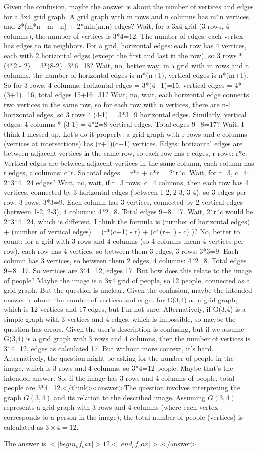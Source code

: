 Given the confusion, maybe the answer is about the number of vertices and edges for a 3x4 grid graph. A grid graph with m rows and n columns has m*n vertices, and 2*(m*n - m - n) + 2*min(m,n) edges? Wait, for a 3x4 grid (3 rows, 4 columns), the number of vertices is 3*4=12. The number of edges: each vertex has edges to its neighbors. For a grid, horizontal edges: each row has 4 vertices, each with 2 horizontal edges (except the first and last in the row), so 3 rows * (4*2 - 2) = 3*(8-2)=3*6=18? Wait, no, better way: in a grid with m rows and n columns, the number of horizontal edges is m*(n+1), vertical edges is n*(m+1). So for 3 rows, 4 columns: horizontal edges = 3*(4+1)=15, vertical edges = 4*(3+1)=16, total edges 15+16=31? Wait, no, wait, each horizontal edge connects two vertices in the same row, so for each row with n vertices, there are n-1 horizontal edges, so 3 rows * (4-1) = 3*3=9 horizontal edges. Similarly, vertical edges: 4 columns * (3-1) = 4*2=8 vertical edges. Total edges 9+8=17? Wait, I think I messed up. Let's do it properly: a grid graph with r rows and c columns (vertices at intersections) has (r+1)(c+1) vertices. Edges: horizontal edges are between adjacent vertices in the same row, so each row has c edges, r rows: r*c. Vertical edges are between adjacent vertices in the same column, each column has r edges, c columns: c*r. So total edges = r*c + c*r = 2*r*c. Wait, for r=3, c=4: 2*3*4=24 edges? Wait, no, wait, if r=3 rows, c=4 columns, then each row has 4 vertices, connected by 3 horizontal edges (between 1-2, 2-3, 3-4), so 3 edges per row, 3 rows: 3*3=9. Each column has 3 vertices, connected by 2 vertical edges (between 1-2, 2-3), 4 columns: 4*2=8. Total edges 9+8=17. Wait, 2*r*c would be 2*3*4=24, which is different. I think the formula is (number of horizontal edges) + (number of vertical edges) = (r*(c+1) - r) + (c*(r+1) - c) )? No, better to count: for a grid with 3 rows and 4 columns (so 4 columns mean 4 vertices per row), each row has 4 vertices, so between them 3 edges, 3 rows: 3*3=9. Each column has 3 vertices, so between them 2 edges, 4 columns: 4*2=8. Total edges 9+8=17. So vertices are 3*4=12, edges 17. But how does this relate to the image of people? Maybe the image is a 3x4 grid of people, so 12 people, connected as a grid graph. But the question is unclear. Given the confusion, maybe the intended answer is about the number of vertices and edges for G(3,4) as a grid graph, which is 12 vertices and 17 edges, but I'm not sure. Alternatively, if G(3,4) is a simple graph with 3 vertices and 4 edges, which is impossible, so maybe the question has errors. Given the user's description is confusing, but if we assume G(3,4) is a grid graph with 3 rows and 4 columns, then the number of vertices is 3*4=12, edges as calculated 17. But without more context, it's hard. Alternatively, the question might be asking for the number of people in the image, which is 3 rows and 4 columns, so 3*4=12 people. Maybe that's the intended answer. So, if the image has 3 rows and 4 columns of people, total people are 3*4=12.</think><answer>The question involves interpreting the graph \( G(3,4) \) and its relation to the described image. Assuming \( G(3,4) \) represents a grid graph with 3 rows and 4 columns (where each vertex corresponds to a person in the image), the total number of people (vertices) is calculated as \( 3 \times 4 = 12 \).  

The answer is \(<|begin_of_box|>12<|end_of_box|>\).</answer>